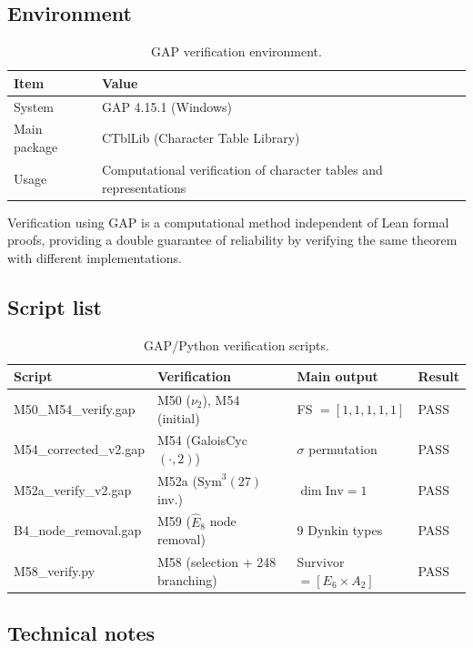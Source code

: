 \documentclass[sn-mathphys-num,Numbered]{sn-jnl}
\theoremstyle{thmstyleone}
\theoremstyle{thmstylethree}
\newcommand{\Ehat}{\hat{E}}
\newcommand{\Inv}{\mathrm{Inv}}
\newcommand{\Sym}{\mathrm{Sym}}
\begin{document}
\begin{appendices}
\subsection{Environment}

\begin{table}[htb]
\centering
\caption{GAP verification environment.}\label{tab:gap-env}
\begin{tabular}{ll}
\toprule
Item & Value \\
\midrule
System & GAP 4.15.1 (Windows) \\
Main package & CTblLib (Character Table Library) \\
Usage & Computational verification of character tables and representations \\
\bottomrule
\end{tabular}
\end{table}

Verification using GAP is a computational method independent of Lean formal
proofs, providing a double guarantee of reliability by verifying the same
theorem with different implementations.


\subsection{Script list}

\begin{table}[htb]
\centering
\caption{GAP/Python verification scripts.}\label{tab:gap-scripts}
\begin{tabular}{llll}
\toprule
Script & Verification & Main output & Result \\
\midrule
M50\_M54\_verify.gap & M50 ($\nu_2$), M54 (initial) &
  FS $= [1,1,1,1,1]$ & PASS \\
M54\_corrected\_v2.gap & M54 (GaloisCyc$(\cdot,2)$) &
  $\sigma$ permutation & PASS \\
M52a\_verify\_v2.gap & M52a ($\Sym^3(27)$ inv.) &
  $\dim \Inv = 1$ & PASS \\
B4\_node\_removal.gap & M59 ($\Ehat_8$ node removal) &
  9 Dynkin types & PASS \\
M58\_verify.py & M58 (selection + 248 branching) &
  Survivor $= [E_6 \times A_2]$ & PASS \\
\bottomrule
\end{tabular}
\end{table}


\subsection{Technical notes}


\end{appendices}
\end{document}
